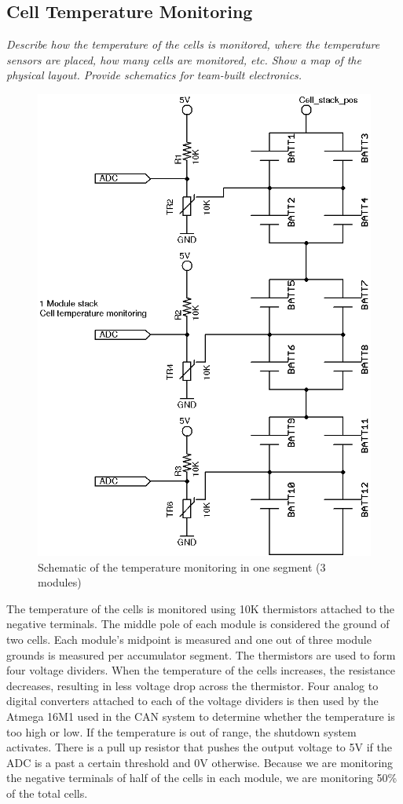 \documentclass{article}
\begin{document}

\subsection{Cell Temperature Monitoring} \label{celltopsection}

    \textit{Describe how the temperature of the cells is monitored, where the temperature sensors are placed, how many cells are monitored, etc. Show a map of the physical layout. Provide schematics for team-built electronics.}


        \begin{figure}[H]
            \centering
            \includegraphics[width = 0.4 \textwidth]{celltemp}
            \caption{Schematic of the temperature monitoring in one segment (3 modules)}
            \label{celltemp}
        \end{figure}


     The temperature of the cells is monitored using 10K thermistors attached to the negative terminals. The middle pole of each module is considered the ground of two cells. Each module's midpoint is measured and one out of three module grounds is measured per accumulator segment. The thermistors are used to form four voltage dividers. When the temperature of the cells increases, the resistance decreases, resulting in less voltage drop across the thermistor. Four analog to digital converters attached to each of the voltage dividers is then used by the Atmega 16M1 used in the CAN system to determine whether the temperature is too high or low. If the temperature is out of range, the shutdown system activates. There is a pull up resistor that pushes the output voltage to 5V if the ADC is a past a certain threshold and 0V otherwise. Because we are monitoring the negative terminals of half of the cells in each module, we are monitoring 50\% of the total cells.
\end{document}
